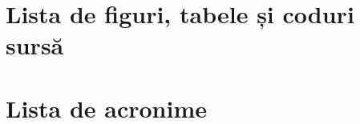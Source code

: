 \documentclass[a4paper,12pt]{report}
\begin{document}
	



\newpage
\setcounter{page}{2}

\newpage
{}
\renewcommand{\bibname}{Bibliografie}
\renewcommand\lstlistlistingname{\normalsize{CODURI SURSĂ}}
\renewcommand{\lstlistingname}{\normalsize{Secvență de Cod}}
\renewcommand{\listfigurename}{FIGURI}
\renewcommand{\cftloftitlefont}{\normalsize}
\renewcommand{\cftfigfont}{\normalsize}
\renewcommand{\cftfigpagefont}{\normalsize}
\renewcommand{\listtablename}{TABELE}
\renewcommand{\cftlottitlefont}{\normalsize}
\renewcommand{\cfttabfont}{\normalsize}
\renewcommand{\cfttabpagefont}{\normalsize}
\tableofcontents
 \clearpage
 \section*{Lista de figuri, tabele și coduri sursă}


 \begingroup
 \let\clearpage\relax
 \listoffigures
 \let\clearpage\relax
 \listoftables
 \let\clearpage\relax
 \lstlistoflistings
 \endgroup


 \clearpage

\section*{Lista de acronime}

\end{document}
